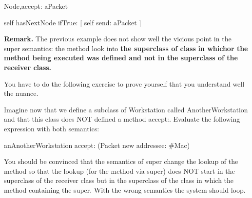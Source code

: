 \begin{scode}
Node\sep{}accept: aPacket

     self hasNextNode
         ifTrue: [ self send: aPacket ]
\end{scode}

\textbf{Remark.} The previous example does not show well the vicious 
point in the super semantics: the method look into \textbf{the superclass 
of class} \textbf{in whichor the method being executed was defined and 
not in the superclass of the receiver class.}

You have to do the following exercise to prove yourself that 
you understand well the nuance.


\exercise Imagine now that we define a subclass of Workstation 
called AnotherWorkstation and that this class does NOT defined 
a method accept:. Evaluate the following expression with both 
semantics:

\begin{scode}
 anAnotherWorkstation accept: (Packet new addressee: \#Mac)
\end{scode}

You should be convinced that the semantics of super change the 
lookup of the method so that the lookup (for the method via super) 
does NOT start in the superclass of the receiver class but in 
the superclass of the class in which the method containing the 
super. With the wrong semantics the system should loop.







\ifx\wholebook\relax\else\fi

